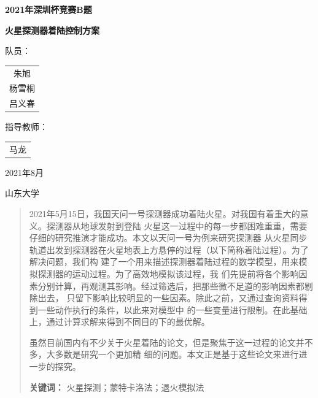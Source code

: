 \documentclass[hyperref,a4paper,UTF8]{ctexart}
\begin{document}
\begin{titlepage}
    \vspace*{\fill}
    \begin{center}
        \normalfont

        {\Huge\bfseries 2021\mbox{年深圳杯竞赛}B\mbox{题}}

        \bigskip
        {\Huge\bfseries 火星探测器着陆控制方案}


        \bigskip
        \bigskip
        \bigskip
        \bigskip
        \bigskip
        \bigskip
        \linespread{1.3}\selectfont
        {\Large\heiti 队员：}
        \Large\kaishu
        \begin{tabular}[t]{@{}c}
            朱旭 \\杨雪桐\\吕义春
        \end{tabular}

        \medskip
        {\Large\heiti 指导教师：}
        \Large\kaishu
        \begin{tabular}[t]{@{}c}
            马龙
        \end{tabular}

        \medskip
        \bigskip
        \bigskip
        \normalfont
        2021年8月
    \end{center}
    \begin{center}
        山东大学
    \end{center}
\end{titlepage}
\begin{abstract}
    2021年5月15日，我国天问一号探测器成功着陆火星。对我国有着重大的意义。探测器从地球发射到登陆
    火星这一过程中的每一步都困难重重，需要仔细的研究推演才能成功。本文以天问一号为例来研究探测器
    从火星同步轨道出发到探测器在火星地表上方悬停的过程（以下简称着陆过程）。为了解决问题，我们构
    建了一个用来描述探测器着陆过程的数学模型，用来模拟探测器的运动过程。为了高效地模拟该过程，我
    们先提前将各个影响因素分别计算，再观测其影响。经过筛选后，把那些微不足道的影响因素都剔除出去，
    只留下影响比较明显的一些因素。除此之前，又通过查询资料得到一些动作执行的条件，以此来对模型中
    的一些变量进行限制。在此基础上，通过计算求解来得到不同目的下的最优解。

    虽然目前国内有不少关于火星着陆的论文，但是聚焦于这一过程的论文并不多，大多数是研究一个更加精
    细的问题。本文正是基于这些论文来进行进一步的探究。\par
    \bigskip
    \bigskip
    \noindent
    \textbf{关键词：} 火星探测；蒙特卡洛法；退火模拟法
\end{abstract}
\newpage
\tableofcontents
\newpage
\end{document}
